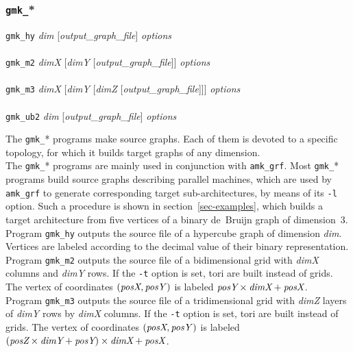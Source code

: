 \subsubsection{\texttt{gmk\_}*}

\begin{itemize}
\progsyn
\texttt{gmk\_hy} {\it dim} [{\it output\_graph\_file}] {\it options}\\
~\\
\texttt{gmk\_m2} {\it dimX} [{\it dimY} [{\it output\_graph\_file}]] {\it options}\\
~\\
\texttt{gmk\_m3} {\it dimX} [{\it dimY} [{\it dimZ} [{\it output\_graph\_file}]]] {\it options}\\
~\\
\texttt{gmk\_ub2} {\it dim} [{\it output\_graph\_file}] {\it options}

\progdes
The \texttt{gmk\_}* programs make source graphs.
Each of them is devoted to a specific topology, for which it builds target
graphs of any dimension.
\\
The \texttt{gmk\_}* programs are mainly used in conjunction with \texttt{amk\_grf}.
Most \texttt{gmk\_}* programs build source graphs
describing parallel machines, which are used by \texttt{amk\_grf} to generate
corresponding target sub-architectures, by means of its \texttt{-l}
option.
Such a procedure is shown in section~\ref{sec-examples}, which builds a target
architecture from five vertices of a binary de~Bruijn graph of dimension~$3$.
\\

\noi
Program \texttt{gmk\_hy} outputs the source file of a hypercube graph of
dimension {\it dim}. Vertices are labeled according to the decimal value
of their binary representation.
\\

\noi
Program \texttt{gmk\_m2} outputs the source file of a bidimensional grid
with {\it dimX\/} columns and {\it dimY\/} rows. If the \texttt{-t}
option is set, tori are built instead of grids. The vertex of
coordinates $(\mbox{\it posX},\mbox{\it posY\/})$ is labeled
$\mbox{\it posY} \times \mbox{\it dimX} + \mbox{\it posX}$.
\\

\noi
Program \texttt{gmk\_m3} outputs the source file of a tridimensional grid
with {\it dimZ} layers of {\it dimY\/} rows by {\it dimX\/}
columns. If the \texttt{-t} option is set, tori are built instead of
grids. The vertex of coordinates $(\mbox{\it posX},\mbox{\it
posY\/})$ is labeled $(\mbox{\it posZ} \times \mbox{\it dimY} +
\mbox{\it posY}) \times \mbox{\it dimX} + \mbox{\it posX}$.
\\


\end{itemize}
